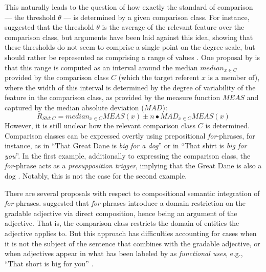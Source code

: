 This naturally leads to the question of how exactly the standard of comparison --- the threshold $\theta$ --- is determined by a given comparison class. For instance, \textcite{Cresswell1976} suggested that the threshold $\theta$ is the average of the relevant feature over the comparison class, but arguments have been laid against this idea, showing that these thresholds do not seem to comprise a single point on the degree scale, but should rather be represented as comprising a range of values \parencite{Kennedy2007, vonStechow1984}. 
One proposal by \textcite[p.194]{Solt2009} is that this range is computed as an interval around the median $median_{x\in C}$ provided by the comparison class $C$ (which the target referent $x$ is a member of), where the width of this interval is determined by the degree of variability of the feature in the comparison class, as provided by the measure function $MEAS$ and captured by the median absolute deviation ($MAD$):
\begin{equation}
R_{Std:C} = median_{x \in C} MEAS(x) \pm n \bullet MAD_{x \in C} MEAS(x)
\end{equation}
However, it is still unclear how the relevant comparison class $C$ is determined. Comparison classes can be expressed overtly using prepositional \textit{for}-phrases, for instance, as in “That Great Dane is \emph{big for a dog}” or in “That shirt is \emph{big for you}”. In the first example, additionally to expressing the comparison class, the \textit{for}-phrase acts as a \textit{presupposition trigger}, implying that the Great Dane is also a dog \parencite[cf.][]{Bale2011, Solt2009}. Notably, this is not the case for the second example. 

There are several proposals with respect to compositional semantic integration of \textit{for}-phrases. \textcite{Kennedy2007} suggested that \textit{for}-phrases introduce a domain restriction on the gradable adjective via direct composition, hence being an argument of the adjective. That is, the comparison class restricts the domain of entities the adjective applies to. But this approach has difficulties accounting for cases when it is not the subject of the sentence that combines with the gradable adjective, or when adjectives appear in what has been labeled by \textcite{ebeling1994children} as \textit{functional uses}, e.g., “That short is big for you” \parencite{Solt2009}. 


